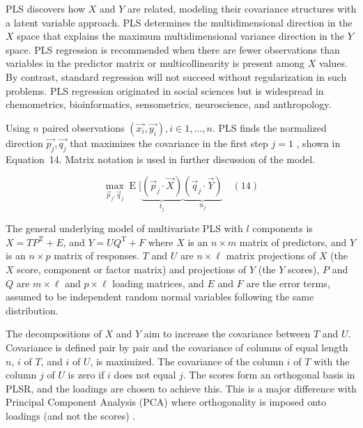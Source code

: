 \documentclass[preprint,12pt]{elsarticle}
\begin{document}
PLS discovers how $X$ and $Y$ are related, modeling their covariance structures with a latent variable approach. PLS determines the multidimensional direction in the $X$ space that explains the maximum multidimensional variance direction in the $Y$ space. PLS regression is recommended when there are fewer observations than variables in the predictor matrix or multicollinearity is present among $X$ values. By contrast, standard regression will not succeed without regularization in such problems. PLS regression originated in social sciences but is widespread in chemometrics, bioinformatics, sensometrics, neuroscience, and anthropology.

Using $n$ paired observations $\left(\vec{x_{i}}, \vec{y_{i}}\right), i \in 1, \dots, n$. PLS finds the normalized direction $\vec{p_{j}}, \vec{q_{j}}$ that maximizes the covariance in the first step $j = 1$ \cite{youtubeYouTube}, shown in Equation~14. Matrix notation is used in further discussion of the model.

\begin{equation}
	\max_{{\vec{p}}_{j},{\vec{q}}_{j}}\operatorname{E} [\underbrace{({\vec{p}}_{j}\cdot {\vec{X}})}_{t_{j}}\underbrace{({\vec{q}}_{j}\cdot {\vec{Y}})}_{u_{j}}
	\quad\left(14\right)
\end{equation}

The general underlying model of multivariate PLS with $l$ components is $X=TP^{\mathrm{T}}+E$, and $Y=UQ^{\mathrm{T}}+F$ where $X$ is an $n\times m$ matrix of predictors, and $Y$ is an $n\times p$ matrix of responses. $T$ and $U$ are $n\times \ell$ matrix projections of $X$ (the $X$ score, component or factor matrix) and projections of $Y$ (the $Y$ scores), $P$ and $Q$ are $m\times \ell $ and $p\times \ell $ loading matrices, and $E$ and $F$ are the error terms, assumed to be independent random normal variables following the same distribution.

The decompositions of $X$ and $Y$ aim to increase the covariance between $T$ and $U$. Covariance is defined pair by pair and the covariance of columns of equal length $n$, $i$ of $T$, and $i$ of $U$, is maximized. The covariance of the column $i$ of $T$ with the column $j$ of $U$ is zero if $i$ does not equal $j$.
The scores form an orthogonal basis in PLSR, and the loadings are chosen to achieve this. This is a major difference with Principal Component Analysis (PCA) where orthogonality is imposed onto loadings (and not the scores) \cite{lindgren1993kernel, de1994comments, dayal1997improved, de1993simpls, rannar1994pls, abdi2010partial}.
\end{document}
